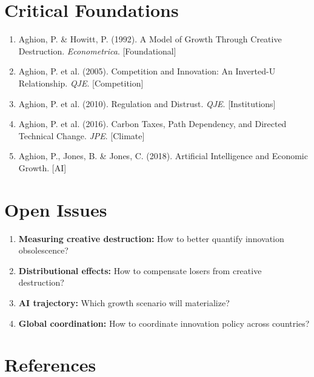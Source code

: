 \section{Critical Foundations}

\begin{enumerate}
    \item Aghion, P. \& Howitt, P. (1992). A Model of Growth Through Creative Destruction. \textit{Econometrica}. [Foundational]
    \item Aghion, P. et al. (2005). Competition and Innovation: An Inverted-U Relationship. \textit{QJE}. [Competition]
    \item Aghion, P. et al. (2010). Regulation and Distrust. \textit{QJE}. [Institutions]
    \item Aghion, P. et al. (2016). Carbon Taxes, Path Dependency, and Directed Technical Change. \textit{JPE}. [Climate]
    \item Aghion, P., Jones, B. \& Jones, C. (2018). Artificial Intelligence and Economic Growth. [AI]
\end{enumerate}

\section{Open Issues}

\begin{enumerate}
    \item \textbf{Measuring creative destruction:} How to better quantify innovation obsolescence?
    \item \textbf{Distributional effects:} How to compensate losers from creative destruction?
    \item \textbf{AI trajectory:} Which growth scenario will materialize?
    \item \textbf{Global coordination:} How to coordinate innovation policy across countries?
\end{enumerate}

\section{References}


